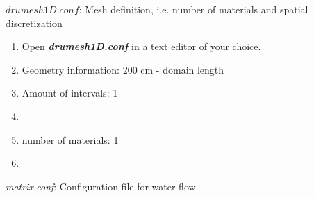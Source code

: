 \documentclass[
10pt, %
a4paper, %
oneside, %
headinclude,footinclude, %
BCOR5mm, %
]{scrartcl}
\begin{document}
$drumesh1D.conf$: Mesh definition, i.e. number of materials and spatial discretization
\begin{enumerate}
\item Open \textbf{\emph{drumesh1D.conf}} in a text editor of your choice. 
\item Geometry information: 200 cm - domain length
\item Amount of intervals: 1
\item
{}
\item number of materials: 1
\item {}
\end{enumerate}

\emph{matrix.conf}: Configuration file for water flow 
\end{document}

